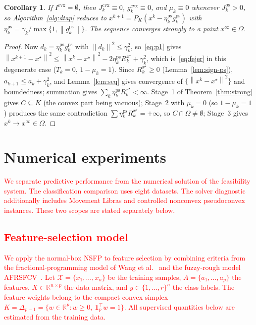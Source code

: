 \documentclass[]{interact}
\theoremstyle{plain}
\newtheorem{corollary}[theorem]{Corollary}
\theoremstyle{definition}
\theoremstyle{remark}
\newcommand{\R}{\mathbb{R}}
\newcommand{\norm}[1]{\left\lVert #1 \right\rVert}
\newcommand{\cvx}{\mathrm{cvx}}
\newcommand{\ps}{\mathrm{ps}}
\begin{document}
\begin{corollary}\label{cor:ps}
If $I^{\cvx}=\emptyset$, then $J^{\cvx}_k\equiv0$, $g^{\cvx}_k\equiv0$, and $\mu_k\equiv0$
whenever $J^{\ps}_k>0$, so Algorithm~\ref{alg:dtap} reduces to
$x^{k+1}=P_K(x^k-\eta^{\ps}_k g^{\ps}_k)$ with $\eta^{\ps}_k=\gamma_k/\max\{1,\norm{g^{\ps}_k}\}$.
The sequence converges strongly to a point $x^\infty\in\Omega$.
\end{corollary}
\begin{proof}
Now $d_k=\eta^{\ps}_k g^{\ps}_k$ with $\norm{d_k}^2\le\gamma_k^2$, so~\eqref{eq:p1} gives
$\norm{x^{k+1}-x^\star}^2\le\norm{x^k-x^\star}^2-2\eta^{\ps}_k R^{x^\star}_k+\gamma_k^2$,
which is~\eqref{eq:fejer} in this degenerate case ($T_k=0$, $1-\mu_k=1$). Since
$R^{x^\star}_k\ge0$ (Lemma~\ref{lem:sign-ps}), $a_{k+1}\le a_k+\gamma_k^2$, and
Lemma~\ref{lem:seq} gives convergence of $\{\norm{x^k-x^\star}^2\}$ and boundedness;
summation gives $\sum_k\eta^{\ps}_k R^{x^\star}_k<\infty$. Stage~1 of
Theorem~\ref{thm:strong} gives $C\subseteq K$ (the convex part being vacuous); Stage~2 with
$\mu_k=0$ (so $1-\mu_k=1$) produces the same contradiction $\sum\eta^{\ps}_k R^{x^\star}_k=+\infty$,
so $C\cap\Omega\ne\emptyset$; Stage~3 gives $x^k\to x^\infty\in\Omega$.
\end{proof}


\section{Numerical experiments}\label{sec:experiments}
\leavevmode\textcolor{red}{We separate predictive performance from the numerical solution of the feasibility system. The classification comparison uses eight datasets. The solver diagnostic additionally includes Movement Libras and controlled nonconvex pseudoconvex instances. These two scopes are stated separately below.}

\subsection{\textcolor{red}{Feature-selection model}}\label{sec:fs}
\leavevmode\textcolor{red}{We apply the normal-box NSFP to feature selection by combining criteria from the fractional-programming model of Wang et al.~\citep{wang2021fractional} and the fuzzy-rough model AFRSFCV~\citep{wang2026afrsfcv}. Let $\mathcal{X}=\{x_1,\ldots,x_n\}$ be the training samples, $A=\{a_1,\ldots,a_p\}$ the features, $X\in\R^{n\times p}$ the data matrix, and $y\in\{1,\ldots,r\}^n$ the class labels. The feature weights belong to the compact convex simplex $K=\Delta_{p-1}=\{w\in\R^p:w\ge0,\ \mathbf1_p^{\top}w=1\}$. All supervised quantities below are estimated from the training data.}
\end{document}
